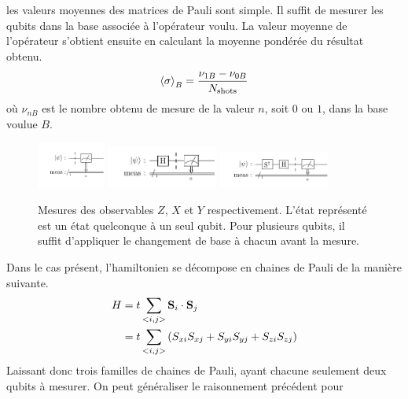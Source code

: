 \documentclass[../main.tex]{subfiles}
\begin{document}
        les valeurs moyennes des matrices de Pauli sont simple.
        Il suffit de mesurer les qubits dans la base associée à l'opérateur voulu.
        La valeur moyenne de l'opérateur s'obtient ensuite en calculant la moyenne
        pondérée du résultat obtenu.
        \begin{align}
            \expval{\sigma}_B&=\frac{\nu_{1B}-\nu_{0B}}{N_{\text{shots}}}\\
        \end{align}
        où $\nu_{nB}$ est le nombre obtenu de mesure de la valeur $n$, soit $0$ ou $1
        $, dans la base voulue $B$.
        \begin{figure}[H]
            \begin{center}
                \includegraphics[width=0.2\textwidth]{figs/measure_z.pdf}
                \includegraphics[width=0.325\textwidth]{figs/measure_x.pdf}
                \includegraphics[width=0.325\textwidth]{figs/measure_y.pdf}
            \end{center}
            \caption{Mesures des observables $Z$, $X$ et $Y$ respectivement. L'état
            représenté est un état quelconque à un seul qubit. Pour plusieurs qubits,
            il suffit d'appliquer le changement de base à chacun avant la mesure.}
            \label{fig:}
        \end{figure}
        Dans le cas présent, l'hamiltonien se décompose en chaines de Pauli de la
        manière suivante.
        \begin{align}
            H&=t\sum_{<i,j>}\mathbf{S}_i\cdot\mathbf{S}_j\\
            &=t\sum_{<i,j>}\qty(S_{xi}S_{xj}+S_{yi}S_{yj}+S_{zi}S_{zj})
        \end{align}
        Laissant donc trois familles de chaines de Pauli, ayant chacune seulement
        deux qubits à mesurer. On peut généraliser le raisonnement précédent pour
\end{document}
